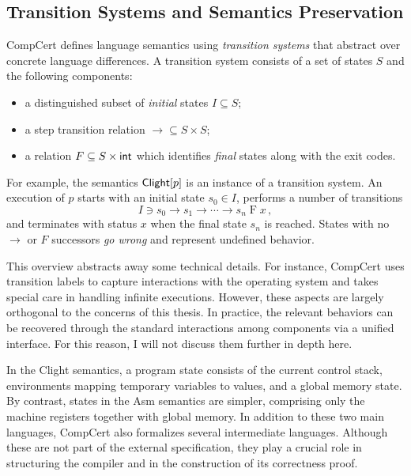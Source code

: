 \subsection{Transition Systems and Semantics Preservation}

CompCert defines language semantics
using \emph{transition systems}
that abstract over concrete language differences.
A transition system consists of
a set of states $S$ and the following components:
\begin{itemize}
  \item a distinguished subset of \emph{initial} states $I \subseteq S$;
  \item a step transition relation ${\rightarrow} \subseteq S \times S$;
  \item a relation $F \subseteq S \times  \mathsf{int} $ which identifies
    \emph{final} states along with the exit codes.
\end{itemize}

For example,
the semantics $ \mathsf{Clight} [p]$
is an instance of a transition system.
An execution of $p$ starts with an initial state $s_0 \in I$,
performs a number of transitions
\[
  I \ni s_0 \rightarrow s_1 \rightarrow \cdots \rightarrow s_n \mathrel{F} x
  \,,
\]
and terminates with status $x$ when the final state $s_n$ is reached.
States with no $\rightarrow$ or $F$ successors
\emph{go wrong} and represent undefined behavior.

\begin{remark}
  \label{rem:compcert-semantics}
  This overview abstracts away some technical details.
  For instance, CompCert uses transition labels
  to capture interactions with the operating system
  and takes special care in handling infinite executions.
  However, these aspects are largely orthogonal
  to the concerns of this thesis.
  In practice, the relevant behaviors can be
  recovered through the standard interactions
  among components via a unified interface.
  For this reason,
  I will not discuss them further in depth here.
\end{remark}

In the Clight semantics,
a program state consists of
the current control stack, environments mapping temporary variables to values,
and a global memory state.
By contrast,
states in the Asm semantics are simpler,
comprising only the machine registers
together with global memory.
In addition to these two main languages,
CompCert also formalizes
several intermediate languages.
Although these are not part of the external specification,
they play a crucial role in structuring the compiler
and in the construction of its correctness proof.

